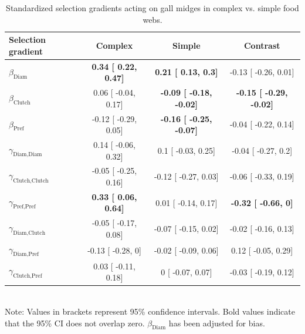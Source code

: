 \documentclass[11pt,]{article}
\begin{document}
\begin{table}[h]
\caption{Standardized selection gradients acting on gall midges in complex vs. simple food webs.}
\label{Table:Gradients}
\centering
\begin{tabular}{lccc}
\\ 
\hline
\textbf{Selection gradient} & \textbf{Complex} & \textbf{Simple} & \textbf{Contrast}  \\ 
\hline
$\beta_{\text{Diam}}$ & 
\textbf{
0.34 [
0.22,
0.47] }& 
\textbf{
0.21 [
0.13,
0.3] }& 

-0.13 [
-0.26,
0.01] \\

$\beta_{\text{Clutch}}$ & 
0.06 [
-0.04,
0.17] & 
\textbf{
-0.09 [
-0.18,
-0.02] }& 
\textbf{
-0.15 [
-0.29,
-0.02] }\\

$\beta_{\text{Pref}}$ &
-0.12 [
-0.29,
0.05] & 
\textbf{
-0.16 [
-0.25,
-0.07] }& 

-0.04 [
-0.22,
0.14] \\

$\gamma_{\text{Diam,Diam}}$ &
0.14 [
-0.06,
0.32] & 

0.1 [
-0.03,
0.25] & 

-0.04 [
-0.27,
0.2] \\

$\gamma_{\text{Clutch,Clutch}}$ & 
-0.05 [
-0.25,
0.16] & 

-0.12 [
-0.27,
0.03] & 

-0.06 [
-0.33,
0.19] \\

$\gamma_{\text{Pref,Pref}}$ & 
\textbf{
0.33 [
0.06,
0.64] }& 

0.01 [
-0.14,
0.17] & 
\textbf{
-0.32 [
-0.66,
0] }\\

$\gamma_{\text{Diam,Clutch}}$ & 
-0.05 [
-0.17,
0.08] & 

-0.07 [
-0.15,
0.02] & 

-0.02 [
-0.16,
0.13] \\

$\gamma_{\text{Diam,Pref}}$ & 
-0.13 [
-0.28,
0] & 

-0.02 [
-0.09,
0.06] & 

0.12 [
-0.05,
0.29] \\

$\gamma_{\text{Clutch,Pref}}$ & 
0.03 [
-0.11,
0.18] & 

0 [
-0.07,
0.07] & 

-0.03 [
-0.19,
0.12] \\ 
\hline
\end{tabular}
\bigskip{}
\\
{\footnotesize Note: Values in brackets represent 95\% confidence intervals. Bold values indicate that the 95\% CI does not overlap zero. $\beta_{\text{Diam}}$ has been adjusted for bias.}
\end{table}
\end{document}
